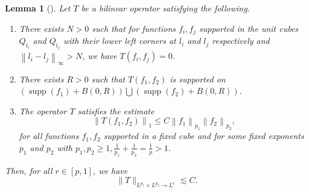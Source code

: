 \documentclass[a4paper,reqno]{amsart}
\newtheorem{lemma}[theorem]{Lemma}
\theoremstyle{definition}
\numberwithin{equation}{section}
\begin{document}
\begin{lemma}[\cite{IPS}]\label{lemma:local}
	Let $T$ be a bilinear operator satisfying the following.
	\begin{enumerate}
		\item There exists $N>0$ such that for functions $f_i, f_j$ supported in the unit cubes $Q_{l_i}$ and $Q_{l_j}$ with their lower left corners at $l_i$ and $l_j$ respectively and $\left\|l_i-l_j\right\|_{\infty}>N$, we have $T\left(f_i, f_j\right)=0$.
		\item There exists $R>0$ such that $T\left(f_1, f_2\right)$ is supported on $\left(\operatorname{supp}\left(f_1\right)+B(0, R)\right) \bigcup\left(\operatorname{supp}\left(f_2\right)+B(0, R)\right)$.
		\item The operator $T$ satisfies the estimate
		\[\left\|T\left(f_1, f_2\right)\right\|_1 \leq C\left\|f_1\right\|_{p_1}\left\|f_2\right\|_{p_2},\]
		for all functions $f_1, f_2$ supported in a fixed cube and for some fixed exponents $p_1$ and $p_2$ with $p_1, p_2 \geq 1, \frac{1}{p_1}+\frac{1}{p_2}=\frac{1}{p}>1$.
	\end{enumerate}
	Then, for all $r \in[p, 1]$, we have
	\[\|T\|_{L^{p_1} \times L^{p_2} \rightarrow L^r} \lesssim C.\]
\end{lemma}
\end{document}
